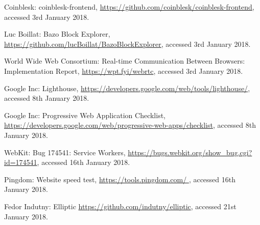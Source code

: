 \begin{thebibliography}{99}
 Coinblesk: coinblesk-frontend, \url{https://github.com/coinblesk/coinblesk-frontend}, accessed 3rd January 2018.

 Luc Boillat: Bazo Block Explorer, \url{https://github.com/lucBoillat/BazoBlockExplorer}, accessed 3rd January 2018.

 World Wide Web Consortium: Real-time Communication Between Browsers: Implementation Report, \url{https://wpt.fyi/webrtc}, accessed 3rd January 2018.

 Google Inc: Lighthouse, \url{https://developers.google.com/web/tools/lighthouse/}, accessed 8th January 2018.

 Google Inc: Progressive Web Application Checklist, \url{https://developers.google.com/web/progressive-web-apps/checklist}, accessed 8th January 2018.

 WebKit: Bug 174541: Service Workers, \url{https://bugs.webkit.org/show_bug.cgi?id=174541}, accessed 16th January 2018.

 Pingdom: Website speed test, \url{https://tools.pingdom.com/
}, accessed 16th January 2018.

 Fedor Indutny: Elliptic \url{https://github.com/indutny/elliptic}, accessed 21st January 2018.
\end{thebibliography}



